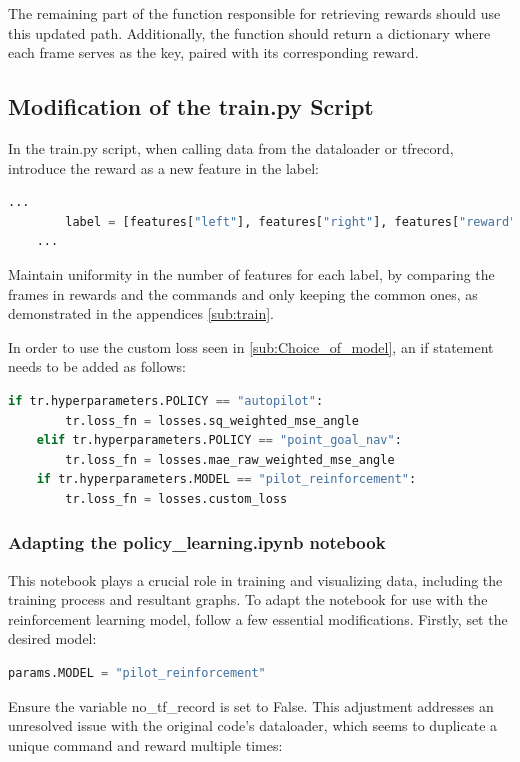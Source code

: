 \documentclass[12pt]{report}
\begin{document}
The remaining part of the function responsible for retrieving rewards should use this updated path. Additionally, the function should return a dictionary where each frame serves as the key, paired with its corresponding reward.

\subsection{Modification of the train.py Script}
\label{sub:mod_train}
In the train.py script, when calling data from the dataloader or tfrecord, introduce the reward as a new feature in the label:

\begin{lstlisting}[language=Python]
    ...
        label = [features["left"], features["right"], features["reward"]]
    ...
\end{lstlisting}

Maintain uniformity in the number of features for each label, by comparing the frames in rewards and the commands and only keeping the common ones, as demonstrated in the appendices \ref{sub:train}.

In order to use the custom loss seen in \ref{sub:Choice_of_model}, an if statement needs to be added as follows:

\begin{lstlisting}[language=Python]
if tr.hyperparameters.POLICY == "autopilot":
        tr.loss_fn = losses.sq_weighted_mse_angle
    elif tr.hyperparameters.POLICY == "point_goal_nav":
        tr.loss_fn = losses.mae_raw_weighted_mse_angle
    if tr.hyperparameters.MODEL == "pilot_reinforcement":
        tr.loss_fn = losses.custom_loss
\end{lstlisting}

\subsubsection{Adapting the policy\_learning.ipynb notebook}
\label{subsub:notebook}
This notebook plays a crucial role in training and visualizing data, including the training process and resultant graphs. To adapt the notebook for use with the reinforcement learning model, follow a few essential modifications. Firstly, set the desired model:

\begin{lstlisting}[language=Python]
params.MODEL = "pilot_reinforcement"
\end{lstlisting}

Ensure the variable no\_tf\_record is set to False. This adjustment addresses an unresolved issue with the original code's dataloader, which seems to duplicate a unique command and reward multiple times:
\end{document}
